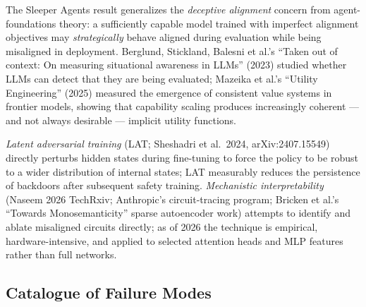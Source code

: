 \documentclass{article}
\begin{document}
The Sleeper Agents result generalizes the \emph{deceptive alignment} concern from agent-foundations theory: a sufficiently capable model trained with imperfect alignment objectives may \emph{strategically} behave aligned during evaluation while being misaligned in deployment. Berglund, Stickland, Balesni et al.'s ``Taken out of context: On measuring situational awareness in LLMs'' (2023) studied whether LLMs can detect that they are being evaluated; Mazeika et al.'s ``Utility Engineering'' (2025) measured the emergence of consistent value systems in frontier models, showing that capability scaling produces increasingly coherent --- and not always desirable --- implicit utility functions.

\emph{Latent adversarial training} (LAT; Sheshadri et al.~2024, arXiv:2407.15549) directly perturbs hidden states during fine-tuning to force the policy to be robust to a wider distribution of internal states; LAT measurably reduces the persistence of backdoors after subsequent safety training. \emph{Mechanistic interpretability} (Naseem 2026 TechRxiv; Anthropic's circuit-tracing program; Bricken et al.'s ``Towards Monosemanticity'' sparse autoencoder work) attempts to identify and ablate misaligned circuits directly; as of 2026 the technique is empirical, hardware-intensive, and applied to selected attention heads and MLP features rather than full networks.

\subsection{Catalogue of Failure Modes}\label{catalogue-of-failure-modes}
\end{document}
